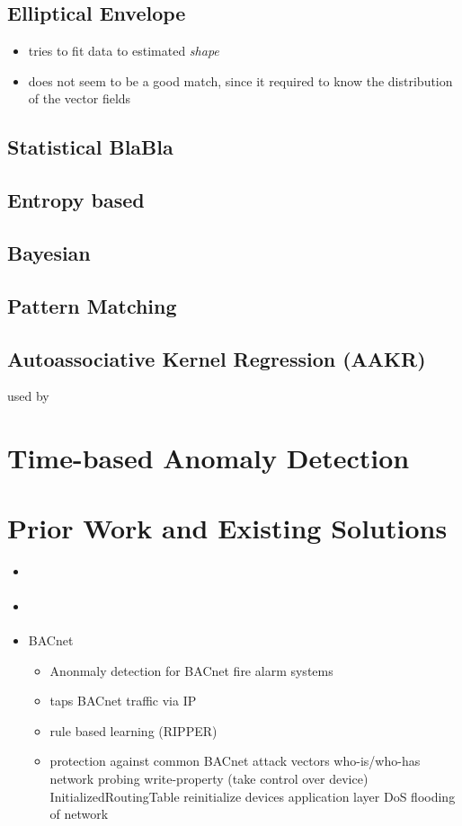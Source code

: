 	\subsection{Elliptical Envelope}
	\begin{itemize}
		\item tries to fit data to estimated \emph{shape}
		\item does not seem to be a good match, since it required to know the distribution of the vector fields
	\end{itemize}

	\subsection{Statistical BlaBla}
	\subsection{Entropy based}
	\subsection{Bayesian}
	\subsection{Pattern Matching}
	\subsection{Autoassociative Kernel Regression (AAKR)}
		used by \textcite{Yang2006}

\section{Time-based Anomaly Detection}

\section{Prior Work and Existing Solutions}
\begin{itemize}
	\item \parencite{Yang2006}
	\item \parencite{Celeda2012}
	\item \textcite{Pan2014} BACnet
		\begin{itemize}
			\item Anonmaly detection for BACnet fire alarm systems
			\item taps BACnet traffic via IP
			\item rule based learning (RIPPER)
			\item protection against common BACnet attack vectors
				\subitem who-is/who-has network probing
				\subitem write-property (take control over device)
				\subitem InitializedRoutingTable
				\subitem reinitialize devices
				\subitem application layer DoS
				\subitem flooding of network
		\end{itemize}
\end{itemize}